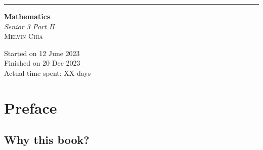 \documentclass{report}
\begin{document}
\newcommand{\sol}[1]{

    \noindent \textbf{Sol.}
}
\newcommand{\prooff}[1]{

    \noindent \textbf{Proof.}
}

\newcommand{\sxrightarrow}[2][]{%
    \mathrel{\text{$\xrightarrow[#1]{#2}$}}%
}

\newenvironment{cequation}{
    \makeatletter
    \setbool{@fleqn}{false}
    \makeatother
    \begin{equation*}
        }{\end{equation*}}

\begin{titlepage}
    \raggedleft{}
    \rule{1pt}{\textheight}
    \hspace{0.02\textwidth}
    \parbox[b]{0.75\textwidth}{

    {\fontsize{40}{60}\selectfont\bfseries Mathematics}\\[2\baselineskip]
    {\huge\textit{Senior 3 Part II}}\\[4\baselineskip]
    {\Large\textsc{Melvin Chia}}

    \vspace{0.5\textheight}

    {\noindent Started on 12 June 2023}\\[\baselineskip]
    {\noindent Finished on 20 Dec 2023}\\[\baselineskip]
    {\noindent Actual time spent: XX days}\\[\baselineskip]}

\end{titlepage}

\onehalfspacing{}

\vspace{-10cm}
\titleformat{\chapter}[display]
{\normalfont\huge\bfseries}{\chaptertitlename\ \thechapter}{20pt}{\Huge}
\titlespacing*{\chapter}{0pt}{-20pt}{40pt}
\chapter*{Preface}
\section*{Why this book?}
\end{document}
